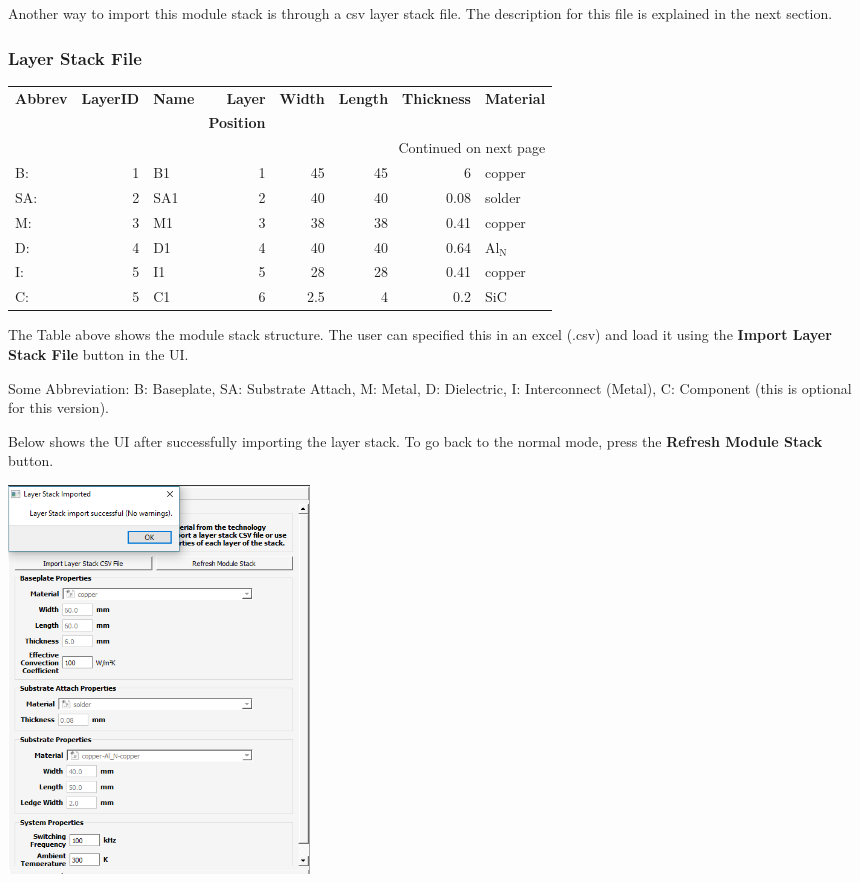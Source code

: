 \documentclass[11pt]{article}
\begin{document}
Another way to import this module stack is through a csv layer stack file. The description for this file is explained in the next section.

\subsubsection{Layer Stack File}
\label{sec-2-3-2}

\begin{longtable}{lrlrrrrl}
\textbf{Abbrev} & \textbf{LayerID} & \textbf{Name} & \textbf{Layer} & \textbf{Width} & \textbf{Length} & \textbf{Thickness} & \textbf{Material}\\
 &  &  & \textbf{Position} &  &  &  & \\
\hline
\endhead
\hline\multicolumn{8}{r}{Continued on next page} \\
\endfoot
\endlastfoot
B: & 1 & B1 & 1 & 45 & 45 & 6 & copper\\
SA: & 2 & SA1 & 2 & 40 & 40 & 0.08 & solder\\
M: & 3 & M1 & 3 & 38 & 38 & 0.41 & copper\\
D: & 4 & D1 & 4 & 40 & 40 & 0.64 & Al$_{\text{N}}$\\
I: & 5 & I1 & 5 & 28 & 28 & 0.41 & copper\\
C: & 5 & C1 & 6 & 2.5 & 4 & 0.2 & SiC\\
\end{longtable}

The Table above shows the module stack structure. The user can specified this in an excel (.csv) and load it using the \textbf{Import Layer Stack File} button in the UI.

Some Abbreviation: B: Baseplate, SA: Substrate Attach, M: Metal, D: Dielectric, I: Interconnect (Metal), C: Component (this is optional for this version).

Below shows the UI after successfully importing the layer stack. To go back to the normal mode, press the \textbf{Refresh Module Stack} button.

\begin{center}
\includegraphics[width=8cm]{./figs/06_LayerStack2.png}
\end{center}
\end{document}
